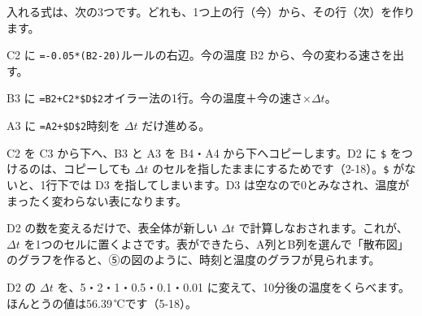 \begin{bkcenter}
\end{bkcenter}
入れる式は、次の3つです。どれも、1つ上の行（今）から、その行（次）を作ります。
\begin{enumerate}[label={\bkcircled[\bkTF]{\arabic*}}, leftmargin=2.4\zw, itemsep=1pt, topsep=2pt]
\item C2 に \texttt{=-0.05*(B2-20)}\quad ルールの右辺。今の温度 B2 から、今の変わる速さを出す。
\item B3 に \texttt{=B2+C2*\$D\$2}\quad オイラー法の1行。今の温度＋今の速さ×$\Delta t$。
\item A3 に \texttt{=A2+\$D\$2}\quad 時刻を $\Delta t$ だけ進める。
\end{enumerate}
C2 を C3 から下へ、B3 と A3 を B4・A4 から下へコピーします。D2 に \texttt{\$} をつけるのは、コピーしても $\Delta t$ のセルを指したままにするためです（2-18）。\texttt{\$} がないと、1行下では D3 を指してしまいます。D3 は空なので0とみなされ、温度がまったく変わらない表になります。

D2 の数を変えるだけで、表全体が新しい $\Delta t$ で計算しなおされます。これが、$\Delta t$ を1つのセルに置くよさです。表ができたら、A列とB列を選んで「散布図」のグラフを作ると、⑤の図のように、時刻と温度のグラフが見られます。


\label{bk:6-2:zure}D2 の $\Delta t$ を、5・2・1・0.5・0.1・0.01 に変えて、10分後の温度をくらべます。ほんとうの値は56.39\,℃です（5-18）。

